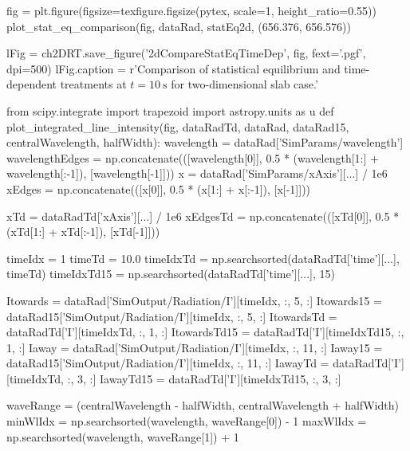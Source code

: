 \begin{pycode}[2DRT]
fig = plt.figure(figsize=texfigure.figsize(pytex, scale=1, height_ratio=0.55))
plot_stat_eq_comparison(fig, dataRad, statEq2d, (656.376, 656.576))

lFig = ch2DRT.save_figure('2dCompareStatEqTimeDep', fig, fext='.pgf', dpi=500)
lFig.caption = r'Comparison of statistical equilibrium and time-dependent treatments at $t=\SI{10}{\second}$ for two-dimensional slab case.'

from scipy.integrate import trapezoid
import astropy.units as u
def plot_integrated_line_intensity(fig, dataRadTd, dataRad, dataRad15, centralWavelength, halfWidth):
    wavelength = dataRad['SimParams/wavelength']
    wavelengthEdges = np.concatenate(([wavelength[0]], 0.5 * (wavelength[1:] + wavelength[:-1]), [wavelength[-1]]))
    x = dataRad['SimParams/xAxis'][...] / 1e6
    xEdges = np.concatenate(([x[0]], 0.5 * (x[1:] + x[:-1]), [x[-1]]))

    xTd = dataRadTd['xAxis'][...] / 1e6
    xEdgesTd = np.concatenate(([xTd[0]], 0.5 * (xTd[1:] + xTd[:-1]), [xTd[-1]]))

    timeIdx = 1
    timeTd = 10.0
    timeIdxTd = np.searchsorted(dataRadTd['time'][...], timeTd)
    timeIdxTd15 = np.searchsorted(dataRadTd['time'][...], 15)

    Itowards = dataRad['SimOutput/Radiation/I'][timeIdx, :, 5, :]
    Itowards15 = dataRad15['SimOutput/Radiation/I'][timeIdx, :, 5, :]
    ItowardsTd = dataRadTd['I'][timeIdxTd, :, 1, :]
    ItowardsTd15 = dataRadTd['I'][timeIdxTd15, :, 1, :]
    Iaway = dataRad['SimOutput/Radiation/I'][timeIdx, :, 11, :]
    Iaway15 = dataRad15['SimOutput/Radiation/I'][timeIdx, :, 11, :]
    IawayTd = dataRadTd['I'][timeIdxTd, :, 3, :]
    IawayTd15 = dataRadTd['I'][timeIdxTd15, :, 3, :]

    waveRange = (centralWavelength - halfWidth, centralWavelength + halfWidth)
    minWlIdx = np.searchsorted(wavelength, waveRange[0]) - 1
    maxWlIdx = np.searchsorted(wavelength, waveRange[1]) + 1


\end{pycode}
